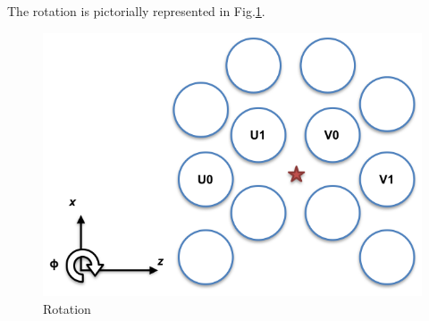 \documentclass[a4paper,11pt]{article}
\begin{document}

The rotation is pictorially represented in Fig.\ref{fig:phi}.
\begin{figure}[!ht]
\centering
\includegraphics[width=0.4\linewidth]{fig/phi.png}
\caption{Rotation}
\label{fig:phi}
\end{figure}
\end{document}
